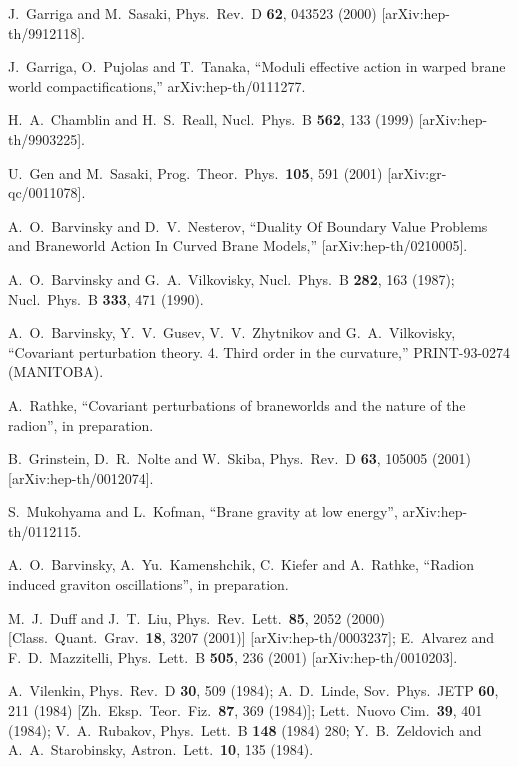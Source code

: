 \documentclass[a4paper,preprint,nofootinbib,
                 showpacs,preprintnumbers,amsmath,amssymb]{revtex4}
\begin{document}
\begin{thebibliography}{99}
J.~Garriga and M.~Sasaki, 
Phys.\ Rev.\ D {\bf 62}, 043523 (2000) 
[arXiv:hep-th/9912118]. 
 
J.~Garriga, O.~Pujolas and T.~Tanaka, 
``Moduli effective action in warped brane world compactifications,'' 
arXiv:hep-th/0111277. 
 
H.~A.~Chamblin and H.~S.~Reall, 
Nucl.\ Phys.\ B {\bf 562}, 133 (1999) 
[arXiv:hep-th/9903225]. 
 
U.~Gen and M.~Sasaki, 
Prog.\ Theor.\ Phys.\  {\bf 105}, 591 (2001) 
[arXiv:gr-qc/0011078]. 
 
A.~O.~Barvinsky and D.~V.~Nesterov, ``Duality Of Boundary Value  
Problems and Braneworld Action In Curved Brane Models,''  
[arXiv:hep-th/0210005]. 
 
 
 
A.~O.~Barvinsky and G.~A.~Vilkovisky, 
Nucl.\ Phys.\ B {\bf 282}, 163 (1987); 
Nucl.\ Phys.\ B {\bf 333}, 471 (1990). 
 
 A.~O.~Barvinsky, Y.~V.~Gusev, V.~V.~Zhytnikov and G.~A.~Vilkovisky, 
``Covariant perturbation theory. 4. Third order in the curvature,'' 
PRINT-93-0274 (MANITOBA). 
 
A.~Rathke,
``Covariant perturbations of braneworlds and the nature of the radion'',
in preparation. 
 
B.~Grinstein, D.~R.~Nolte and W.~Skiba, 
Phys.\ Rev.\ D {\bf 63}, 105005 (2001) 
[arXiv:hep-th/0012074]. 
 
S.~Mukohyama and L.~Kofman, ``Brane gravity at low energy'', 
arXiv:hep-th/0112115. 
 
A.~O.~Barvinsky, A.~Yu.~Kamenshchik, C.~Kiefer 
    and A.~Rathke, ``Radion induced graviton oscillations'', in preparation. 
 

M.~J.~Duff and J.~T.~Liu, 
Phys.\ Rev.\ Lett.\  {\bf 85}, 2052 (2000) 
[Class.\ Quant.\ Grav.\  {\bf 18}, 3207 (2001)] 
[arXiv:hep-th/0003237]; 
E.~Alvarez and F.~D.~Mazzitelli, 
Phys.\ Lett.\ B {\bf 505}, 236 (2001) 
[arXiv:hep-th/0010203]. 
 
A.~Vilenkin, 
Phys.\ Rev.\ D {\bf 30}, 509 (1984); 
A.~D.~Linde, 
Sov.\ Phys.\ JETP {\bf 60}, 211 (1984) 
[Zh.\ Eksp.\ Teor.\ Fiz.\  {\bf 87}, 369 (1984)]; 
Lett.\ Nuovo Cim.\  {\bf 39}, 401 (1984); 
V.~A.~Rubakov, 
Phys.\ Lett.\ B {\bf 148} (1984) 280; 
Y.~B.~Zeldovich and A.~A.~Starobinsky, 
Astron.\ Lett.\  {\bf 10}, 135 (1984). 
 

\end{thebibliography}
\end{document}
